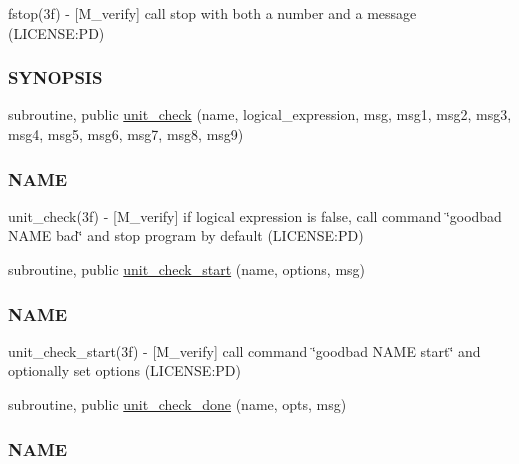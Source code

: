 \begin{DoxyCompactItemize}
\begin{DoxyCompactList}
fstop(3f) -\/ \mbox{[}M\+\_\+verify\mbox{]} call stop with both a number and a message (L\+I\+C\+E\+N\+SE\+:PD) \subsubsection*{S\+Y\+N\+O\+P\+S\+IS}\end{DoxyCompactList}\item 
subroutine, public \mbox{\hyperlink{namespacem__verify_a96149da1a302f2a157d79dadc94e755e}{unit\+\_\+check}} (name, logical\+\_\+expression, msg, msg1, msg2, msg3, msg4, msg5, msg6, msg7, msg8, msg9)
\begin{DoxyCompactList}\small\item\em \subsubsection*{N\+A\+ME}

unit\+\_\+check(3f) -\/ \mbox{[}M\+\_\+verify\mbox{]} if logical expression is false, call command \char`\"{}goodbad N\+A\+M\+E bad\char`\"{} and stop program by default (L\+I\+C\+E\+N\+SE\+:PD) \end{DoxyCompactList}\item 
subroutine, public \mbox{\hyperlink{namespacem__verify_ad753d0a58dbc02c8917bf2b2aa3e1de7}{unit\+\_\+check\+\_\+start}} (name, options, msg)
\begin{DoxyCompactList}\small\item\em \subsubsection*{N\+A\+ME}

unit\+\_\+check\+\_\+start(3f) -\/ \mbox{[}M\+\_\+verify\mbox{]} call command \char`\"{}goodbad N\+A\+M\+E start\char`\"{} and optionally set options (L\+I\+C\+E\+N\+SE\+:PD) \end{DoxyCompactList}\item 
subroutine, public \mbox{\hyperlink{namespacem__verify_a0c0ed723b61b2cbbebb81fa91edd1941}{unit\+\_\+check\+\_\+done}} (name, opts, msg)
\begin{DoxyCompactList}\small\item\em \subsubsection*{N\+A\+ME}


\end{DoxyCompactList}
\end{DoxyCompactItemize}
